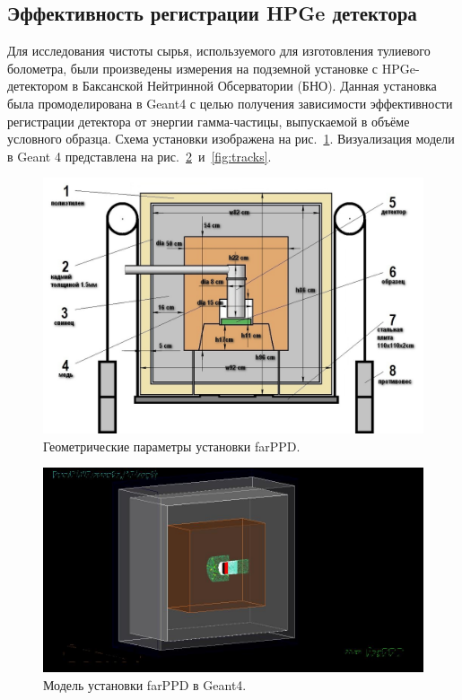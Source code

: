 \documentclass[a4paper,article,14pt]{extarticle}
\begin{document}
\subsection{Эффективность регистрации HPGe детектора}
Для исследования чистоты сырья, используемого для изготовления тулиевого болометра, были произведены измерения на подземной установке с HPGe-детектором в Баксанской Нейтринной Обсерватории (БНО).
Данная установка была промоделирована в Geant4 с целью получения зависимости эффективности регистрации детектора от энергии гамма-частицы, выпускаемой в объёме условного образца.
Схема установки изображена на рис.~\ref{fig:geom}.
Визуализация модели в Geant 4 представлена на рис.~\ref{fig:vis}~и~\ref{fig:tracks}.
\begin{figure}[t]
    \centering
    \includegraphics[width=.9\textwidth]{images/farPPD_size.jpg}
    \caption{Геометрические параметры установки farPPD.}\label{fig:geom}
\end{figure}
\begin{figure}[t]
    \centering
    \includegraphics[width=.9\textwidth]{images/Visualisation.jpg}
    \caption{Модель установки farPPD в Geant4.}\label{fig:vis}
\end{figure}
\end{document}
